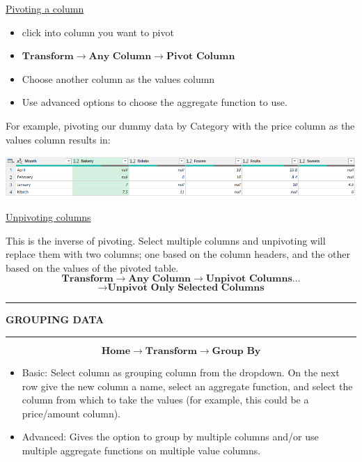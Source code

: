 \documentclass[8pt]{extarticle}
\newcommand{\heading}[1]{%
    \noindent
    \rule{\linewidth}{0.4pt}
    \begin{center}
        \vspace{-1ex}
        \textbf{#1}        
        \vspace{-2.5ex}
    \end{center}
    \rule{\linewidth}{0.4pt}
}
\begin{document}
\begin{multicols}{3}
\begin{center}
    \underline{Pivoting a column}
\end{center}

\begin{itemize}
    \item click into column you want to pivot
    \item $\textbf{Transform} \rightarrow \textbf{Any Column} \rightarrow \textbf{Pivot Column}$
    \item Choose another column as the values column 
    \item Use advanced options to choose the aggregate function to use.
\end{itemize}

For example, pivoting our dummy data by Category with the price column as the values column results in:
\begin{center}
    \includegraphics[width=0.98\columnwidth]{images/pivot_column.png}
\end{center}

\begin{center}
    \underline{Unpivoting columns}
\end{center}

This is the inverse of pivoting. Select multiple columns and unpivoting will replace them with two columns; one based on the column headers, and the other based on the values of the pivoted table.
\[\textbf{Transform} \rightarrow \textbf{Any Column} \rightarrow \textbf{Unpivot Columns...}\]\[ \rightarrow  \textbf{Unpivot Only Selected Columns} \]

\heading{GROUPING DATA}

\[\textbf{Home} \rightarrow \textbf{Transform} \rightarrow \textbf{Group By}\]

\begin{itemize}
    \item Basic: Select column as grouping column from the dropdown. On the next row give the new column a name, select an aggregate function, and select the column from which to take the values (for example, this could be a price/amount column).
    \item Advanced: Gives the option to group by multiple columns and/or use multiple aggregate functions on multiple value columns.
\end{itemize}


\end{multicols}
\end{document}
